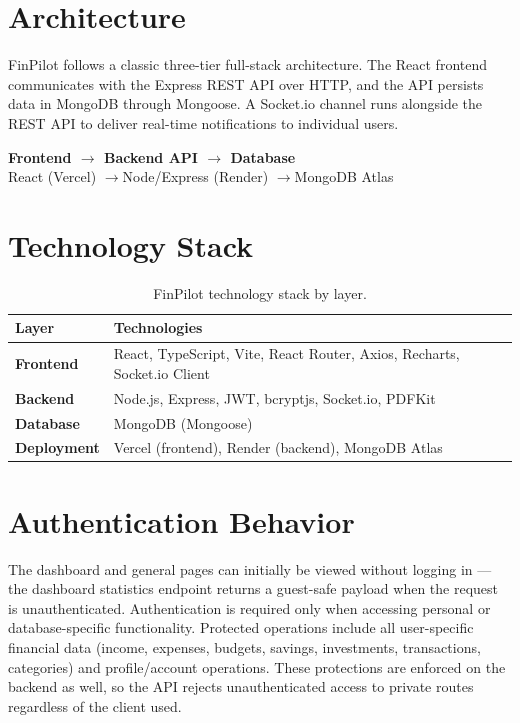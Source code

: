 \documentclass[11pt,a4paper]{report}
\begin{document}
\section{Architecture}
FinPilot follows a classic three-tier full-stack architecture. The React
frontend communicates with the Express REST API over HTTP, and the API persists
data in MongoDB through Mongoose. A Socket.io channel runs alongside the REST API
to deliver real-time notifications to individual users.

\begin{center}
\vspace{0.3cm}
{\large\bfseries\color{brandprimary} Frontend \;$\longrightarrow$\; Backend API \;$\longrightarrow$\; Database}\\[0.2cm]
{\small React (Vercel) \quad$\longrightarrow$\quad Node/Express (Render) \quad$\longrightarrow$\quad MongoDB Atlas}
\vspace{0.3cm}
\end{center}

\section{Technology Stack}
\begin{table}[H]
\centering
\begin{tabularx}{\linewidth}{>{\bfseries}l X}
\toprule
Layer & Technologies \\
\midrule
Frontend   & React, TypeScript, Vite, React Router, Axios, Recharts, Socket.io Client \\
Backend    & Node.js, Express, JWT, bcryptjs, Socket.io, PDFKit \\
Database   & MongoDB (Mongoose) \\
Deployment & Vercel (frontend), Render (backend), MongoDB Atlas \\
\bottomrule
\end{tabularx}
\caption{FinPilot technology stack by layer.}
\end{table}

\section{Authentication Behavior}
The dashboard and general pages can initially be viewed without logging in ---
the dashboard statistics endpoint returns a guest-safe payload when the request
is unauthenticated. Authentication is required only when accessing personal or
database-specific functionality. Protected operations include all user-specific
financial data (income, expenses, budgets, savings, investments, transactions,
categories) and profile/account operations. These protections are enforced on
the backend as well, so the API rejects unauthenticated access to private routes
regardless of the client used.
\end{document}
